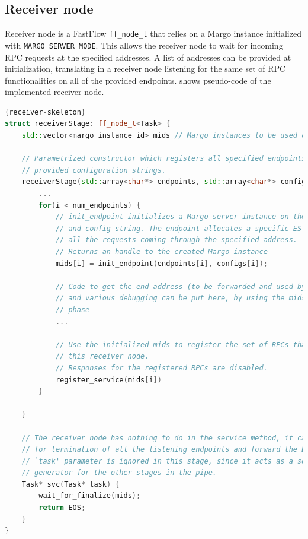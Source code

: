 \subsection{Receiver node}
Receiver node is a FastFlow \texttt{ff\_node\_t} that relies on a Margo instance initialized with \texttt{MARGO\_SERVER\_MODE}. This allows the receiver node to wait for incoming RPC requests at the specified addresses. A list of addresses can be provided at initialization, translating in a receiver node listening for the same set of RPC functionalities on all of the provided endpoints.  shows pseudo-code of the implemented receiver node.
\begin{lstlisting}[language=C++, style=mystyle, caption={Receiver node pseudo-code.}, label={receiver-skeleton}]{receiver-skeleton}
struct receiverStage: ff_node_t<Task> {
    std::vector<margo_instance_id> mids // Margo instances to be used during servicing

    // Parametrized constructor which registers all specified endpoints with the
    // provided configuration strings.
    receiverStage(std::array<char*> endpoints, std::array<char*> configs) {
        ...
        for(i < num_endpoints) {
            // init_endpoint initializes a Margo server instance on the provided address
            // and config string. The endpoint allocates a specific ES and pool to handle
            // all the requests coming through the specified address.
            // Returns an handle to the created Margo instance
            mids[i] = init_endpoint(endpoints[i], configs[i]);
            
            // Code to get the end address (to be forwarded and used by the sender node)
            // and various debugging can be put here, by using the mids generate by the init
            // phase
            ...
            
            // Use the initialized mids to register the set of RPCs that will be offered by
            // this receiver node.
            // Responses for the registered RPCs are disabled.
            register_service(mids[i])
        }
    
    }
    
    // The receiver node has nothing to do in the service method, it can simply wait
    // for termination of all the listening endpoints and forward the EOS at the end.
    // `task' parameter is ignored in this stage, since it acts as a sort of `endo-stream'
    // generator for the other stages in the pipe.
    Task* svc(Task* task) {
        wait_for_finalize(mids);
        return EOS;
    }
}
\end{lstlisting}

